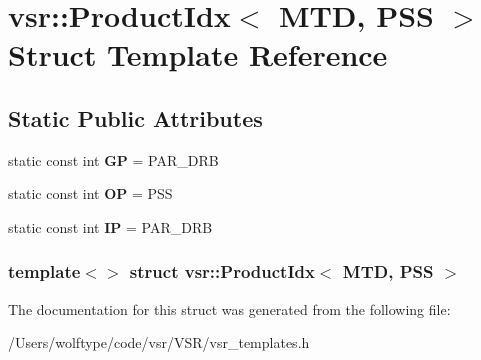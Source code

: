 \hypertarget{structvsr_1_1_product_idx_3_01_m_t_d_00_01_p_s_s_01_4}{\section{vsr\-:\-:Product\-Idx$<$ M\-T\-D, P\-S\-S $>$ Struct Template Reference}
\label{structvsr_1_1_product_idx_3_01_m_t_d_00_01_p_s_s_01_4}
}
\subsection*{Static Public Attributes}
\begin{DoxyCompactItemize}
\item 
\hypertarget{structvsr_1_1_product_idx_3_01_m_t_d_00_01_p_s_s_01_4_a39aa994f2b822c6ef142b43408c05127}{static const int {\bfseries G\-P} = P\-A\-R\-\_\-\-D\-R\-B}\label{structvsr_1_1_product_idx_3_01_m_t_d_00_01_p_s_s_01_4_a39aa994f2b822c6ef142b43408c05127}

\item 
\hypertarget{structvsr_1_1_product_idx_3_01_m_t_d_00_01_p_s_s_01_4_a8299fe5d96caf3ff48b9d7d71dd7a327}{static const int {\bfseries O\-P} = P\-S\-S}\label{structvsr_1_1_product_idx_3_01_m_t_d_00_01_p_s_s_01_4_a8299fe5d96caf3ff48b9d7d71dd7a327}

\item 
\hypertarget{structvsr_1_1_product_idx_3_01_m_t_d_00_01_p_s_s_01_4_a2337a3cc29468ccd61e36678e8070a17}{static const int {\bfseries I\-P} = P\-A\-R\-\_\-\-D\-R\-B}\label{structvsr_1_1_product_idx_3_01_m_t_d_00_01_p_s_s_01_4_a2337a3cc29468ccd61e36678e8070a17}

\end{DoxyCompactItemize}
\subsubsection*{template$<$$>$ struct vsr\-::\-Product\-Idx$<$ M\-T\-D, P\-S\-S $>$}



The documentation for this struct was generated from the following file\-:\begin{DoxyCompactItemize}
\item 
/\-Users/wolftype/code/vsr/\-V\-S\-R/vsr\-\_\-templates.\-h\end{DoxyCompactItemize}
